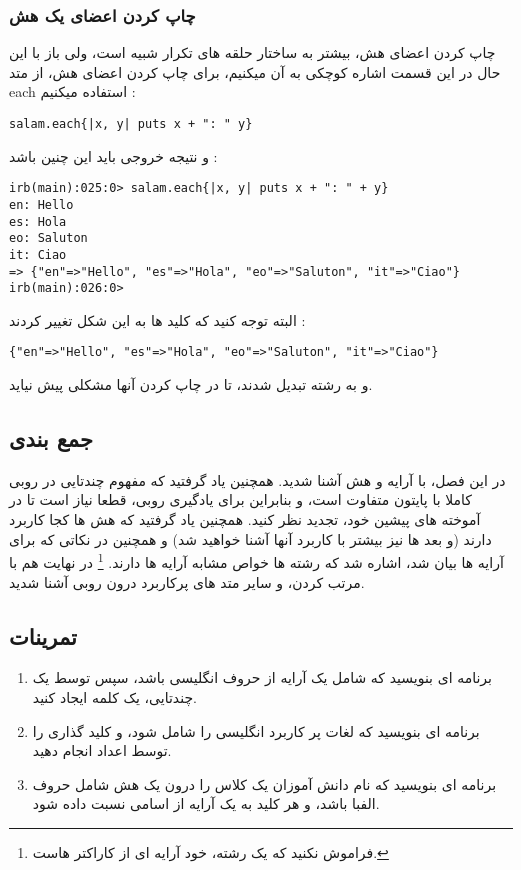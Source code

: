 \documentclass[11pt]{article}
\begin{document}
\subsubsection{چاپ کردن اعضای یک هش}
چاپ کردن اعضای هش، بیشتر به ساختار حلقه های تکرار شبیه است، ولی باز با این حال در این قسمت اشاره کوچکی به آن میکنیم، برای چاپ کردن اعضای هش، از متد each استفاده میکنیم :
\begin{latin}
\begin{verbatim}
salam.each{|x, y| puts x + ": " y}
\end{verbatim}
\end{latin}
و نتیجه خروجی باید این چنین باشد :
\begin{latin}
\begin{verbatim}
irb(main):025:0> salam.each{|x, y| puts x + ": " + y}
en: Hello
es: Hola
eo: Saluton
it: Ciao
=> {"en"=>"Hello", "es"=>"Hola", "eo"=>"Saluton", "it"=>"Ciao"}
irb(main):026:0>
\end{verbatim}
\end{latin}
البته توجه کنید که کلید ها به این شکل تغییر کردند :
\begin{latin}
\begin{verbatim}
{"en"=>"Hello", "es"=>"Hola", "eo"=>"Saluton", "it"=>"Ciao"}
\end{verbatim}
\end{latin}
و به رشته تبدیل شدند، تا در چاپ کردن آنها مشکلی پیش نیاید. 
\subsection{جمع بندی}
در این فصل، با آرایه و هش آشنا شدید. همچنین یاد گرفتید که مفهوم چندتایی در روبی کاملا با پایتون متفاوت است، و بنابراین برای یادگیری روبی، قطعا نیاز است تا در آموخته های پیشین خود، تجدید نظر کنید. همچنین یاد گرفتید که هش ها کجا کاربرد دارند (و بعد ها نیز بیشتر با کاربرد آنها آشنا خواهید شد) و همچنین در نکاتی که برای آرایه ها بیان شد، اشاره شد که رشته ها خواص مشابه آرایه ها دارند.
\footnote{فراموش نکنید که یک رشته، خود آرایه ای از کاراکتر هاست.}
در نهایت هم با مرتب کردن، و سایر متد های پرکاربرد درون روبی آشنا شدید. 
\subsection{تمرینات}
\begin{enumerate}
\item برنامه ای بنویسید که شامل یک آرایه از حروف انگلیسی باشد، سپس توسط یک چندتایی، یک کلمه ایجاد کنید. 
\item برنامه ای بنویسید که لغات پر کاربرد انگلیسی را شامل شود، و کلید گذاری را توسط اعداد انجام دهید. 
\item برنامه ای بنویسید که نام دانش آموزان یک کلاس را درون یک هش شامل حروف الفبا باشد، و هر کلید به یک آرایه از اسامی نسبت داده شود. 
\end{enumerate}
\newpage{}
\end{document}
